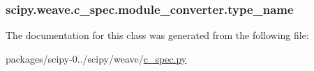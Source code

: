\subsubsection[{type\+\_\+name}]{\setlength{\rightskip}{0pt plus 5cm}scipy.\+weave.\+c\+\_\+spec.\+module\+\_\+converter.\+type\+\_\+name}\label{classscipy_1_1weave_1_1c__spec_1_1module__converter_ae1e74061f42f3e9efeb12cca8f68eadd}


The documentation for this class was generated from the following file\+:\begin{DoxyCompactItemize}
\item 
packages/scipy-\/0../scipy/weave/\hyperlink{c__spec_8py}{c\+\_\+spec.\+py}\end{DoxyCompactItemize}
